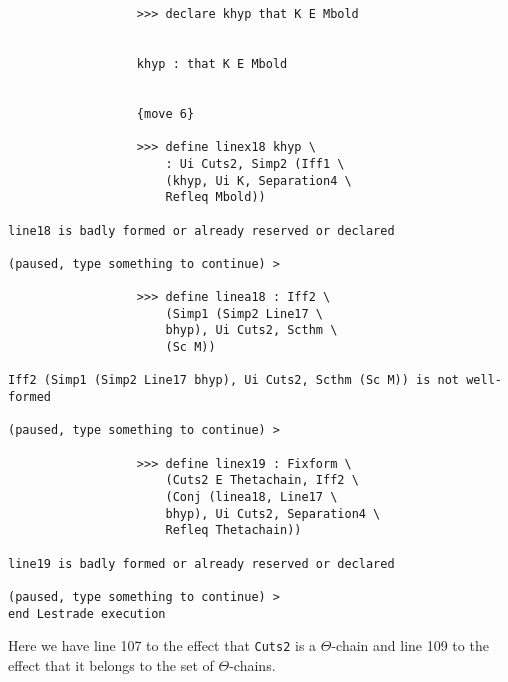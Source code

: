 \documentclass[12pt]{article}
\begin{document}
\begin{verbatim}
                  >>> declare khyp that K E Mbold


                  khyp : that K E Mbold


                  {move 6}

                  >>> define linex18 khyp \
                      : Ui Cuts2, Simp2 (Iff1 \
                      (khyp, Ui K, Separation4 \
                      Refleq Mbold))

line18 is badly formed or already reserved or declared

(paused, type something to continue) >

                  >>> define linea18 : Iff2 \
                      (Simp1 (Simp2 Line17 \
                      bhyp), Ui Cuts2, Scthm \
                      (Sc M))

Iff2 (Simp1 (Simp2 Line17 bhyp), Ui Cuts2, Scthm (Sc M)) is not well-formed

(paused, type something to continue) >

                  >>> define linex19 : Fixform \
                      (Cuts2 E Thetachain, Iff2 \
                      (Conj (linea18, Line17 \
                      bhyp), Ui Cuts2, Separation4 \
                      Refleq Thetachain))

line19 is badly formed or already reserved or declared

(paused, type something to continue) >
end Lestrade execution
\end{verbatim}

Here we have line 107 to the effect that {\tt Cuts2} is a $\Theta$-chain and line 109 to the effect that it belongs to the set of $\Theta$-chains.
\end{document}
